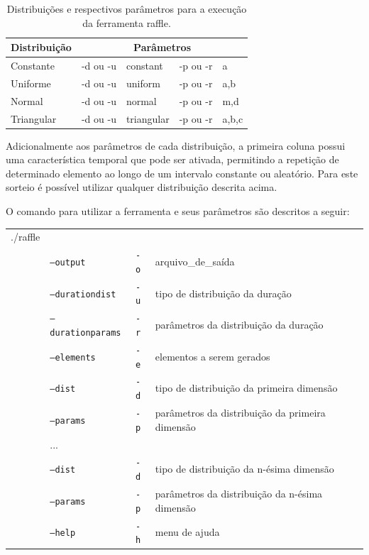 \begin{table}[!h]
	\centering
	\caption{Distribuições e respectivos parâmetros para a execução da ferramenta raffle.}
	\label{tab:distparam}
	\begin{tabular}{l|l|l|l|l}
		\hline
		Distribuição & \multicolumn{4}{c}{Parâmetros} \\
		\hline
		Constante  & -d ou -u & constant   & -p ou -r & a \\
		Uniforme   & -d ou -u & uniform	   & -p ou -r & a,b \\
		Normal     & -d ou -u & normal	   & -p ou -r & m,d \\
		Triangular & -d ou -u & triangular & -p ou -r & a,b,c \\
		\hline
	\end{tabular}
\end{table}

Adicionalmente aos parâmetros de cada distribuição, a primeira coluna possui uma característica temporal que pode ser ativada, permitindo a repetição de determinado elemento ao longo de um intervalo constante ou aleatório. Para este sorteio é possível utilizar qualquer distribuição descrita acima.

O comando para utilizar a ferramenta e seus parâmetros são descritos a seguir:

\begin{table}[!h]
	\begin{tabular}{llll}
	./raffle & & \\ 
	& \texttt{--output} & \texttt{-o} & arquivo\_de\_saída \\
	& \texttt{--durationdist} & \texttt{-u}  & tipo de distribuição da duração \\
	& \texttt{--durationparams} & \texttt{-r}  & parâmetros da distribuição da duração \\
	& \texttt{--elements} & \texttt{-e}  & elementos a serem gerados \\
	& \texttt{--dist} & \texttt{-d}  & tipo de distribuição da primeira dimensão \\
	& \texttt{--params} & \texttt{-p}  & parâmetros da distribuição da primeira dimensão \\
	& ... & \\
	& \texttt{--dist} & \texttt{-d}  & tipo de distribuição da n-ésima dimensão \\
	& \texttt{--params} & \texttt{-p}  & parâmetros da distribuição da n-ésima dimensão \\
	& \texttt{--help} & \texttt{-h}  & menu de ajuda \\
	\end{tabular}
\end{table}

